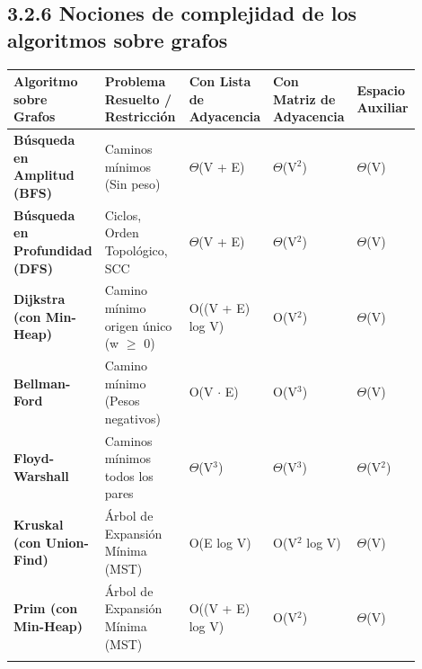 \documentclass[11pt,letterpaper]{article}
\begin{document}
\subsection*{3.2.6 Nociones de complejidad de los algoritmos sobre grafos}
\vspace{4pt}\noindent
\begin{tabular}{>{\raggedright\arraybackslash}p{0.208\linewidth}>{\raggedright\arraybackslash}p{0.235\linewidth}>{\raggedright\arraybackslash}p{0.166\linewidth}>{\raggedright\arraybackslash}p{0.152\linewidth}>{\raggedright\arraybackslash}p{0.138\linewidth}}
\toprule
\textbf{\color{ipnguinda}Algoritmo sobre Grafos} & \textbf{\color{ipnguinda}Problema Resuelto / Restricción} & \textbf{\color{ipnguinda}Con Lista de Adyacencia} & \textbf{\color{ipnguinda}Con Matriz de Adyacencia} & \textbf{\color{ipnguinda}Espacio Auxiliar} \\
\midrule
\textbf{Búsqueda en Amplitud (BFS)} & Caminos mínimos (Sin peso) & $\Theta$(V + E) & $\Theta$(V$^2$) & $\Theta$(V) \\
\addlinespace[3pt]
\textbf{Búsqueda en Profundidad (DFS)} & Ciclos, Orden Topológico, SCC & $\Theta$(V + E) & $\Theta$(V$^2$) & $\Theta$(V) \\
\addlinespace[3pt]
\textbf{Dijkstra (con Min-Heap)} & Camino mínimo origen único (w $\ge$ 0) & O((V + E) log V) & O(V$^2$) & $\Theta$(V) \\
\addlinespace[3pt]
\textbf{Bellman-Ford} & Camino mínimo (Pesos negativos) & O(V $\cdot$ E) & O(V$^3$) & $\Theta$(V) \\
\addlinespace[3pt]
\textbf{Floyd-Warshall} & Caminos mínimos todos los pares & $\Theta$(V$^3$) & $\Theta$(V$^3$) & $\Theta$(V$^2$) \\
\addlinespace[3pt]
\textbf{Kruskal (con Union-Find)} & Árbol de Expansión Mínima (MST) & O(E log V) & O(V$^2$ log V) & $\Theta$(V) \\
\addlinespace[3pt]
\textbf{Prim (con Min-Heap)} & Árbol de Expansión Mínima (MST) & O((V + E) log V) & O(V$^2$) & $\Theta$(V) \\
\addlinespace[3pt]
\bottomrule
\end{tabular}
\vspace{6pt}\par
\end{document}
